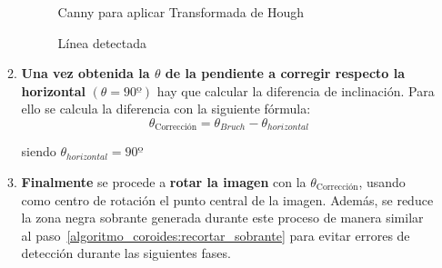 \begin{enumerate}
\begin{enumerate}[label*=\arabic*.]
    \begin{figure}[H]
      \caption{Canny para aplicar Transformada de Hough}
      \centering \setlength\fboxsep{0pt} \setlength\fboxrule{0.5pt}
    \end{figure}

    \begin{figure}[H]
      \caption{Línea detectada}
      \centering \setlength\fboxsep{0pt} \setlength\fboxrule{0.5pt}
    \end{figure}


  \item \textbf{Una vez obtenida la $\theta$ de la pendiente a
      corregir respecto la horizontal} $\left( \theta = 90º \right)$
    hay que calcular la diferencia de inclinación. Para ello se
    calcula la diferencia con la siguiente fórmula:
    \begin{equation*}
      \theta_\text{Corrección} = \theta_{Bruch} - \theta_{horizontal}
    \end{equation*}
    \begin{center}
      siendo $\theta_{horizontal} = 90º$
    \end{center}
  \item \textbf{Finalmente} se procede a \textbf{rotar la imagen} con
    la $\theta_{\text{Corrección}}$, usando como centro de rotación el
    punto central de la imagen. Además, se reduce la zona negra
    sobrante generada durante este proceso de manera similar al
    paso~\ref{algoritmo_coroides:recortar_sobrante} para evitar
    errores de detección durante las siguientes fases.


\end{enumerate}
\end{enumerate}
